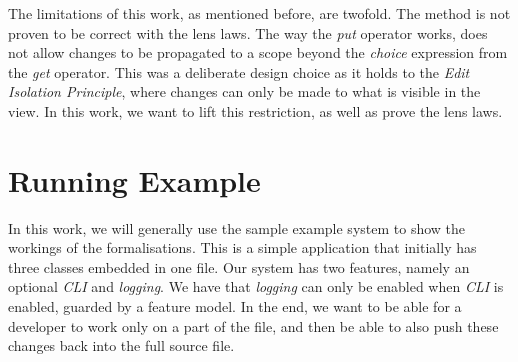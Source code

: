 The limitations of this work, as mentioned before, are twofold. The method
is not proven to be correct with the lens laws. The way the \emph{put}
operator works, does not allow changes to be propagated to a scope beyond
the \emph{choice} expression from the \emph{get} operator. This was a
deliberate design choice as it holds to the \emph{Edit Isolation Principle},
where changes can only be made to what is visible in the view. In this work,
we want to lift this restriction, as well as prove the lens laws.

\section{Running Example}\label{sec:background:example}
In this work, we will generally use the sample example system to show the workings of
the formalisations. This is a simple application that initially has three classes
embedded in one file. Our system has two features, namely an optional \emph{CLI} and
\emph{logging}. We have that \emph{logging} can only be enabled when \emph{CLI} is
enabled, guarded by a feature model. In the end, we want to be able for a developer
to work only on a part of the file, and then be able to also push these changes
back into the full source file.
